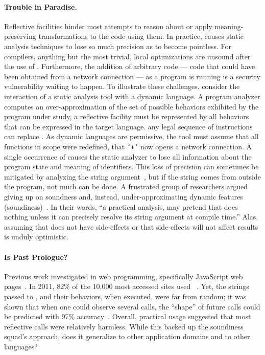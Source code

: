 \documentclass[review,screen,acmsmall]{acmart}%
\begin{document}
\paragraph{Trouble in Paradise.} Reflective facilities hinder
most attempts to reason about or apply meaning-preserving transformations to the
code using them. In practice, \eval causes static analysis techniques to lose so
much precision as to become pointless. For compilers, anything but the most
trivial, local optimizations are unsound after the use of \eval. Furthermore, the
addition of arbitrary code --- code that could have been obtained from a network
connection --- as a program is running is a security vulnerability waiting to
happen. To illustrate these challenges, consider the interaction of a static
analysis tool with a dynamic language. A program analyzer computes an
over-approximation of the set of possible behaviors exhibited by the program
under study, a reflective facility must be represented by all behaviors that can
be expressed in the target language. \ie any legal sequence of instructions can
replace \eval. As dynamic languages are permissive, the tool must assume that
all functions in scope were redefined, \eg that \texttt{`+`} now opens a network
connection. A single occurrence of \eval causes the static analyzer to lose all
information about the program state and meaning of identifiers. This loss of
precision can sometimes be mitigated by analyzing the string
argument~\cite{moller03}, but if the string comes from outside the program, not
much can be done. A frustrated group of researchers argued giving up on
soundness and, instead, under-approximating dynamic features
(soundiness)~\cite{soundy}. In their words, ``a practical analysis, may pretend
that \eval does nothing unless it can precisely resolve its string argument at
compile time.'' Alas, assuming that \eval does not have side-effects or that
side-effects will not affect results is unduly optimistic.

\paragraph{Is Past Prologue?} Previous work investigated
\eval in web programming, specifically JavaScript web pages~\cite{pldi10a}. In
2011, 82\% of the 10,000 most accessed sites used \eval~\cite{ecoop11}. Yet, the
strings passed to \eval, and their behaviors, when executed, were far from
random; it was shown that when one could observe several calls, the ``shape'' of
future calls could be predicted with 97\% accuracy~\cite{oopsla12b}. Overall,
practical usage suggested that most reflective calls were relatively harmless.
While this backed up the soundiness squad's approach, does it generalize to
other application domains and to other languages?
\end{document}
